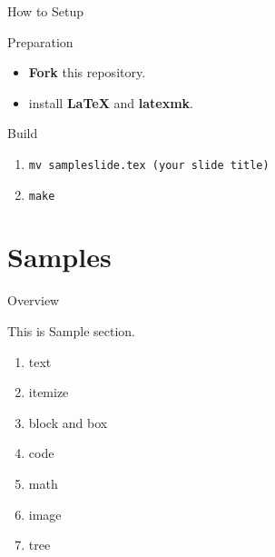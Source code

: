 \documentclass[aspectratio=1610,14pt]{beamer}
\begin{document}
\begin{frame}{How to Setup}
    \begin{textblock}{Preparation}
        \begin{itemize}
            \item{\textbf{Fork} this repository.}
            \item{install \textbf{LaTeX} and \textbf{latexmk}.}
        \end{itemize}
    \end{textblock}

    \begin{textblock}{Build}
        \begin{enumerate}
            \item{\lstinline|mv sampleslide.tex (your slide title)|}
            \item{\lstinline|make|}
        \end{enumerate}
    \end{textblock}
\end{frame}

\section{Samples}
\begin{frame}
    \tableofcontents[currentsection]
\end{frame}

\begin{frame}{Overview}
    \begin{textblock}{This is Sample section.}
        \begin{enumerate}
            \item{text}
            \item{itemize}
            \item{block and box}
            \item{code}
            \item{math}
            \item{image} 
            \item{tree}
        \end{enumerate}
    \end{textblock}
\end{frame}
\end{document}
